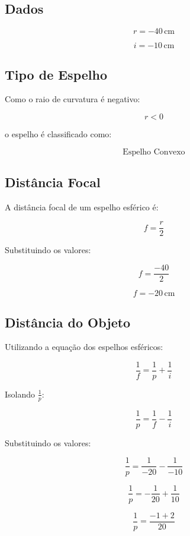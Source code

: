 \documentclass[12pt,a4paper]{article}
\begin{document}
\subsection*{Dados}

\[
r = -40\,\text{cm}
\]

\[
i = -10\,\text{cm}
\]


\subsection*{Tipo de Espelho}

Como o raio de curvatura é negativo:

\[
r < 0
\]

o espelho é classificado como:

\[
\boxed{\text{Espelho Convexo}}
\]


\subsection*{Distância Focal}

A distância focal de um espelho esférico é:

\[
f = \frac{r}{2}
\]

Substituindo os valores:

\[
f = \frac{-40}{2}
\]

\[
f = -20\,\text{cm}
\]


\subsection*{Distância do Objeto}

Utilizando a equação dos espelhos esféricos:

\[
\frac{1}{f} = \frac{1}{p} + \frac{1}{i}
\]

Isolando $\frac{1}{p}$:

\[
\frac{1}{p} = \frac{1}{f} - \frac{1}{i}
\]

Substituindo os valores:

\[
\frac{1}{p}
=
\frac{1}{-20}
-
\frac{1}{-10}
\]

\[
\frac{1}{p}
=
-\frac{1}{20}
+
\frac{1}{10}
\]

\[
\frac{1}{p}
=
\frac{-1 + 2}{20}
\]
\end{document}
